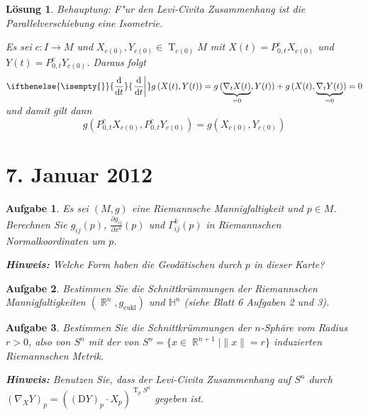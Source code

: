 \documentclass[paper=A4, twoside, chapterprefix=true, bibliography=totoc, headsepline]{scrbook}
\DeclareMathOperator{\R}{\mathbb{R}}
\DeclareMathOperator{\T}{T}         %
\newcommand{\dop}{\mathrm{d}}
\newcommand{\difffrac}[3][]{\ifthenelse{\isempty{#1}}{\frac{\dop #2}{\dop #3}}{\left. \frac{\dop #2}{\dop #3} \right|_{#1}}}
\theoremstyle{plain}
\theoremstyle{nonumberplain}
\theoremstyle{empty}
\theoremstyle{break}
\newtheorem{Aufg}{Aufgabe}
\newtheorem{Loes}{L\"osung}
\begin{document}
\begin{Loes}
\emph{Behauptung:} F"ur den Levi-Civita Zusammenhang ist die Parallelverschiebung eine Isometrie.

Es sei $c: I \to M$ und $X_{c(0)}, Y_{c(0)} \in \T_{c(0)}M$ mit $X(t) = P_{0,t}^c X_{c(0)}$ und $Y(t) = P_{0,t}^c Y_{c(0)}$. Daraus folgt
	\[ \difffrac{}{t} g\left(X(t), Y(t)\right) = g\left( \smash{\underbrace{\nabla_tX(t)}_{=0}}, Y(t) \right) + g \left( X(t), \smash{\underbrace{\nabla_t Y(t)}_{=0}} \right) = 0\]
und damit gilt dann
	\[ g \left( P_{0,t}^c X_{c(0)}, P_{0,t}^c Y_{c(0)} \right) = g \left( X_{c(0)}, Y_{c(0)} \right) \]
\end{Loes}


\section{7. Januar 2012}
\setcounter{Aufg}{0} %
\setcounter{Loes}{0}

\begin{Aufg}
Es sei $(M,g)$ eine Riemannsche Mannigfaltigkeit und $p\in M$. Berechnen Sie $g_{ij}(p)$, $\frac{\partial g_{ij}}{\partial x^k}(p)$  und $\Gamma_{ij}^k(p)$ in Riemannschen Normalkoordinaten um $p$.

{\footnotesize \textbf{Hinweis:} Welche Form haben die Geodätischen durch $p$ in dieser Karte?}
\end{Aufg}

\begin{Aufg}
Bestimmen Sie die Schnittkrümmungen der Riemannschen Mannigfaltigkeiten $(\R^n,g_{\mathrm{eukl}})$ und $\mathbb{H}^n$ (siehe Blatt 6 Aufgaben 2 und 3).
\end{Aufg}

\begin{Aufg}
Bestimmen Sie die Schnittkrümmungen der $n$-Sphäre vom Radius $r>0$, also von $S^n$ mit der von $S^n=\{x \in \R^{n+1} \mid \|x\|=r\}$ induzierten Riemannschen Metrik.

{\footnotesize \textbf{Hinweis:} Benutzen Sie, dass der Levi-Civita Zusammenhang auf $S^n$  durch $(\nabla_X Y)_p=((\mathrm{D} Y)_p \cdot X_p)^{\T_p S^n}$ gegeben ist.}
\end{Aufg}
\end{document}
